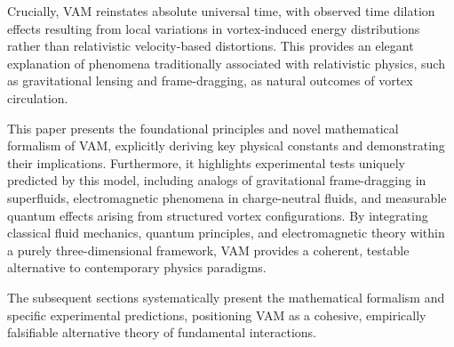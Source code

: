 Crucially, VAM reinstates absolute universal time, with observed time dilation effects resulting from local variations in vortex-induced energy distributions rather than relativistic velocity-based distortions. This provides an elegant explanation of phenomena traditionally associated with relativistic physics, such as gravitational lensing and frame-dragging, as natural outcomes of vortex circulation.

This paper presents the foundational principles and novel mathematical formalism of VAM, explicitly deriving key physical constants and demonstrating their implications. Furthermore, it highlights experimental tests uniquely predicted by this model, including analogs of gravitational frame-dragging in superfluids, electromagnetic phenomena in charge-neutral fluids, and measurable quantum effects arising from structured vortex configurations. By integrating classical fluid mechanics, quantum principles, and electromagnetic theory within a purely three-dimensional framework, VAM provides a coherent, testable alternative to contemporary physics paradigms.

The subsequent sections systematically present the mathematical formalism and specific experimental predictions, positioning VAM as a cohesive, empirically falsifiable alternative theory of fundamental interactions.